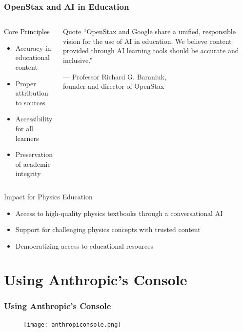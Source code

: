 \documentclass{beamer}
\begin{document}
\begin{frame}
\frametitle{OpenStax and AI in Education}

\begin{columns}
\begin{block}{Core Principles}
\begin{itemize}
\item Accuracy in educational content
\item Proper attribution to sources
\item Accessibility for all learners
\item Preservation of academic integrity
\end{itemize}
\end{block}

\begin{alertblock}{Quote}
\small ``OpenStax and Google share a unified, responsible vision for the use of AI in education. We believe content provided through AI learning tools should be accurate and inclusive.''
\begin{flushright}
\scriptsize — Professor Richard G. Baraniuk,\\founder and director of OpenStax
\end{flushright}
\end{alertblock}
\end{columns}

\vspace{0.5cm}
\begin{block}{Impact for Physics Education}
\begin{itemize}
\item Access to high-quality physics textbooks through a conversational AI
\item Support for challenging physics concepts with trusted content
\item Democratizing access to educational resources
\end{itemize}
\end{block}
\end{frame}

\section{Using Anthropic's Console}
\frame{\sectionpage}

\begin{frame}
\frametitle{Using Anthropic's Console}
\begin{figure}
    \centering
    \texttt{[image: anthropiconsole.png]}
\end{figure}
\end{frame}
\end{document}

